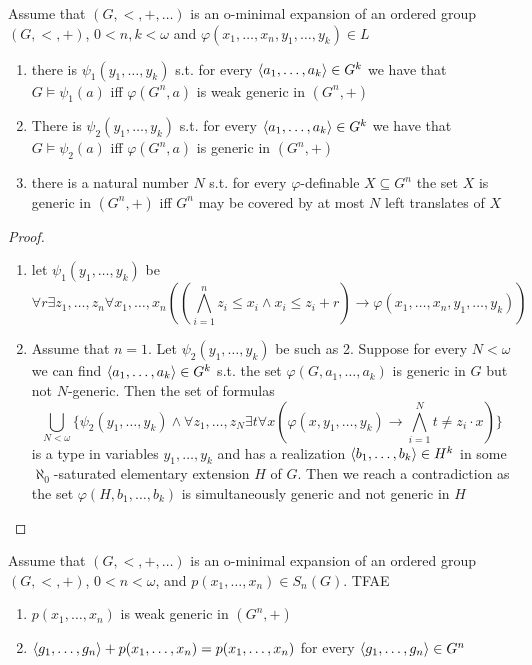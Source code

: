 \documentclass[11pt]{article}
\begin{document}
\begin{corollary}[]
Assume that \((G,<,+,\dots)\) is an o-minimal expansion of an ordered group \((G,<,+)\), \(0<n,k<\omega\)
and \(\varphi(x_1,\dots,x_n,y_1,\dots,y_k)\in L\)
\begin{enumerate}
\item there is \(\psi_1(y_1,\dots,y_k)\) s.t. for every \(\langle a_1,\dots,a_k\rangle\in G^k\) we have that \(G\vDash\psi_1(a)\)
iff \(\varphi(G^n,a)\) is weak generic in \((G^n,+)\)
\item There is \(\psi_2(y_1,\dots,y_k)\) s.t. for every \(\langle a_1,\dots,a_k\rangle\in G^k\) we have that \(G\vDash\psi_2(a)\)
iff \(\varphi(G^n,a)\) is generic in \((G^n,+)\)
\item there is a natural number \(N\) s.t. for every \(\varphi\)-definable \(X\subseteq G^n\) the set \(X\) is generic
in \((G^n,+)\) iff \(G^n\) may be covered by at most \(N\) left translates of \(X\)
\end{enumerate}
\end{corollary}

\begin{proof}
\begin{enumerate}
\item let \(\psi_1(y_1,\dots,y_k)\) be
\begin{equation*}
\forall r\exists z_1,\dots,z_n\forall x_1,\dots,x_n((\bigwedge_{i=1}^nz_i\le x_i\wedge x_i\le z_i+r)\to\varphi(x_1,\dots,x_n,y_1,\dots,y_k))
\end{equation*}
\setcounter{enumi}{2}
\item Assume that \(n=1\). Let \(\psi_2(y_1,\dots,y_k)\) be such as 2. Suppose for every \(N<\omega\) we can
find \(\langle a_1,\dots,a_k\rangle\in G^k\) s.t. the set \(\varphi(G,a_1,\dots,a_k)\) is generic in \(G\) but
not \(N\)-generic. Then the set of formulas
\begin{equation*}
\bigcup_{N<\omega}\{\psi_2(y_1,\dots,y_k)\wedge\forall z_1,\dots,z_N\exists t\forall x(\varphi(x,y_1,\dots,y_k)\to\bigwedge_{i=1}^Nt\neq z_i\cdot x)\}
\end{equation*}
is a type in variables \(y_1,\dots,y_k\) and has a realization \(\langle b_1,\dots,b_k\rangle\in H^k\) in
some \(\aleph_0\)-saturated elementary extension \(H\) of \(G\). Then we reach a contradiction as
the set \(\varphi(H,b_1,\dots,b_k)\) is simultaneously generic and not generic in \(H\)
\end{enumerate}
\end{proof}

\begin{corollary}[]
Assume that \((G,<,+,\dots)\) is an o-minimal expansion of an ordered group \((G,<,+)\), \(0<n<\omega\),
and \(p(x_1,\dots,x_n)\in S_n(G)\). TFAE
\begin{enumerate}
\item \(p(x_1,\dots,x_n)\) is weak generic in \((G^n,+)\)
\item \(\langle g_1,\dots,g_n\rangle+p(x_1,\dots,x_n)=p(x_1,\dots,x_n)\) for every \(\langle g_1,\dots,g_n\rangle\in  G^n\)
\end{enumerate}
\end{corollary}
\end{document}
